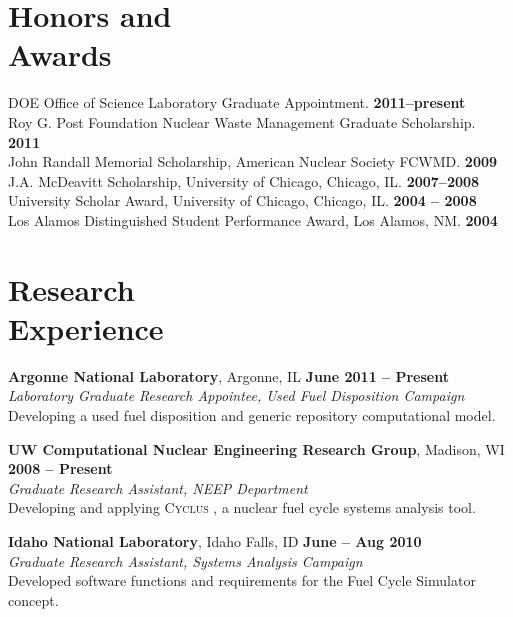 \documentclass[margin,line]{resume}
\newcommand{\Cyclus}{\textsc{Cyclus }}
\begin{document}
\begin{resume}
    \section{\mysidestyle Honors and\\Awards} 
		DOE Office of Science Laboratory Graduate Appointment.                 \hfill \textbf{2011--present}\vspace{.5mm}\\%
		Roy G. Post Foundation Nuclear Waste Management Graduate Scholarship.       \hfill \textbf{2011}\vspace{.5mm}\\%
		John Randall Memorial Scholarship, American Nuclear Society FCWMD.          \hfill \textbf{2009}\vspace{.5mm}\\%
		J.A. McDeavitt Scholarship, University of Chicago, Chicago, IL.        \hfill\textbf{2007--2008}\vspace{.5mm}\\%
		University Scholar Award, University of Chicago, Chicago, IL.        \hfill\textbf{2004 -- 2008}\vspace{.5mm}\\%
		Los Alamos Distinguished Student Performance Award, Los Alamos, NM.          \hfill\textbf{2004}\vspace{.5mm}\\%
    \section{\mysidestyle Research\\Experience}
    \textbf{Argonne National Laboratory}, Argonne, IL \hfill \textbf{June 2011 -- Present}\\
		\textsl{Laboratory Graduate Research Appointee, Used Fuel Disposition Campaign}\\ 
		Developing a used fuel disposition and generic repository computational model.

    \textbf{UW Computational Nuclear Engineering Research Group}, Madison, WI \hfill \textbf{2008 -- Present}\\
		\textsl{Graduate Research Assistant, NEEP Department}\\ 
		Developing and applying \Cyclus, a nuclear fuel cycle systems analysis tool.

    \textbf{Idaho National Laboratory}, Idaho Falls, ID \hfill \textbf{June -- Aug 2010}\\
		\textsl{Graduate Research Assistant, Systems Analysis Campaign}\\ 
		Developed software functions and requirements for the Fuel Cycle Simulator concept.


\end{resume}
\end{document}
